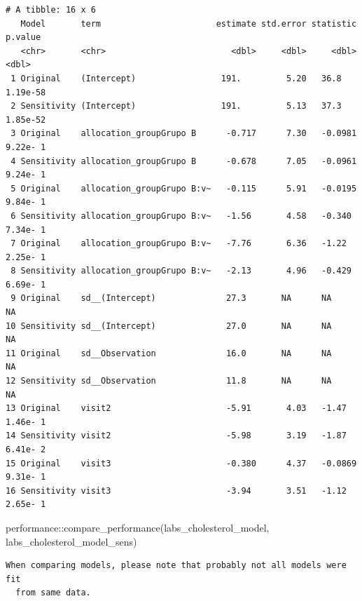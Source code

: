 \documentclass[
  letterpaper,
  DIV=11,
  numbers=noendperiod]{scrartcl}
\newenvironment{Shaded}{\begin{snugshade}}{\end{snugshade}}
\newcommand{\FunctionTok}[1]{\textcolor[rgb]{0.28,0.35,0.67}{#1}}
\newcommand{\NormalTok}[1]{\textcolor[rgb]{0.00,0.23,0.31}{#1}}
\newcommand{\SpecialCharTok}[1]{\textcolor[rgb]{0.37,0.37,0.37}{#1}}
\begin{document}
\begin{verbatim}
# A tibble: 16 x 6
   Model       term                       estimate std.error statistic   p.value
   <chr>       <chr>                         <dbl>     <dbl>     <dbl>     <dbl>
 1 Original    (Intercept)                 191.         5.20   36.8     1.19e-58
 2 Sensitivity (Intercept)                 191.         5.13   37.3     1.85e-52
 3 Original    allocation_groupGrupo B      -0.717      7.30   -0.0981  9.22e- 1
 4 Sensitivity allocation_groupGrupo B      -0.678      7.05   -0.0961  9.24e- 1
 5 Original    allocation_groupGrupo B:v~   -0.115      5.91   -0.0195  9.84e- 1
 6 Sensitivity allocation_groupGrupo B:v~   -1.56       4.58   -0.340   7.34e- 1
 7 Original    allocation_groupGrupo B:v~   -7.76       6.36   -1.22    2.25e- 1
 8 Sensitivity allocation_groupGrupo B:v~   -2.13       4.96   -0.429   6.69e- 1
 9 Original    sd__(Intercept)              27.3       NA      NA      NA       
10 Sensitivity sd__(Intercept)              27.0       NA      NA      NA       
11 Original    sd__Observation              16.0       NA      NA      NA       
12 Sensitivity sd__Observation              11.8       NA      NA      NA       
13 Original    visit2                       -5.91       4.03   -1.47    1.46e- 1
14 Sensitivity visit2                       -5.98       3.19   -1.87    6.41e- 2
15 Original    visit3                       -0.380      4.37   -0.0869  9.31e- 1
16 Sensitivity visit3                       -3.94       3.51   -1.12    2.65e- 1
\end{verbatim}

\begin{Shaded}
\begin{Highlighting}[]
\NormalTok{performance}\SpecialCharTok{::}\FunctionTok{compare\_performance}\NormalTok{(labs\_cholesterol\_model, labs\_cholesterol\_model\_sens)}
\end{Highlighting}
\end{Shaded}

\begin{verbatim}
When comparing models, please note that probably not all models were fit
  from same data.
\end{verbatim}
\end{document}
